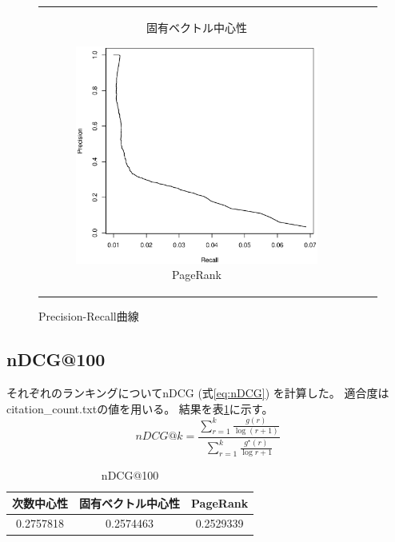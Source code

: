\documentclass{jsarticle}
\begin{document}
\begin{figure}[h]
\begin{tabular}{ccc}
\begin{subfigure}[h]{.33\linewidth}
            \caption{固有ベクトル中心性}
        \end{subfigure}
        \begin{subfigure}[h]{.33\linewidth}
            \includegraphics[width=\linewidth]{img/prcurve_p.eps}
            \caption{PageRank}
        \end{subfigure}
    \end{tabular}
    \caption{Precision-Recall曲線}
    \label{img:prcurve}
\end{figure}

\subsection{nDCG@100}
それぞれのランキングについてnDCG (式\ref{eq:nDCG}) を計算した。
適合度はcitation\_count.txtの値を用いる。
結果を表\ref{tbl:nDCG}に示す。
\begin{equation}
    nDCG@k = \frac{\sum_{r=1}^k{\frac{g(r)}{\log{(r+1)}}}}{\sum_{r=1}^k{\frac{g^\star(r)}{\log{r+1}}}}
    \label{eq:nDCG}
\end{equation}
\begin{table}[h]
    \centering
    \caption{nDCG@100}
    \label{tbl:nDCG}
    \begin{tabular}{ccc} \hline
        次数中心性 & 固有ベクトル中心性 & PageRank \\ \hline \hline
        0.2757818 & 0.2574463 & 0.2529339 \\ \hline
    \end{tabular}
\end{table}
\end{document}
